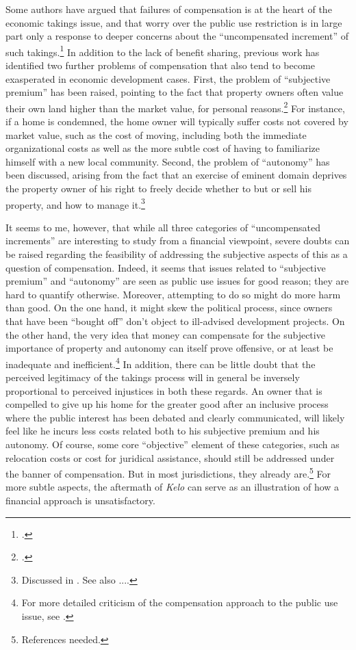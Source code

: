 Some authors have argued that failures of compensation is at the heart of the economic takings issue, and that worry over the public use restriction is in large part only a response to deeper concerns about the ``uncompensated increment'' of such takings.\footcite[See][962]{fennell04} In addition to the lack of benefit sharing, previous work has identified two further problems of compensation that also tend to become exasperated in economic development cases. First, the problem of ``subjective premium'' has been raised, pointing to the fact that property owners often value their own land higher than the market value, for personal reasons.\footcite[963]{fennell04} For instance, if a home is condemned, the home owner will typically suffer costs not covered by market value, such as the cost of moving, including both the immediate organizational costs as well as the more subtle cost of having to familiarize himself with a new local community. Second, the problem of ``autonomy'' has been discussed, arising from the fact that an exercise of eminent domain deprives the property owner of his right to freely decide whether to but or sell his property, and how to manage it.\footnote{Discussed in \cite[966-967]{fennell04}. See also ....}

It seems to me, however, that while all three categories of ``uncompensated increments'' are interesting to study from a financial viewpoint, severe doubts can be raised regarding the feasibility of addressing the subjective aspects of this as a question of compensation. Indeed, it seems that issues related to ``subjective premium'' and ``autonomy'' are seen as public use issues for good reason; they are hard to quantify otherwise. Moreover, attempting to do so might do more harm than good. On the one hand, it might skew the political process, since owners that have been ``bought off'' don't object to ill-advised development projects. On the other hand, the very idea that money can compensate for the subjective importance of property and autonomy can itself prove offensive, or at least be inadequate and inefficient.\footnote{For more detailed criticism of the compensation approach to the public use issue, see \cite{garnett06}.} In addition, there can be little doubt that the perceived legitimacy of the takings process will in general be inversely proportional to perceived injustices in both these regards. An owner that is compelled to give up his home for the greater good after an inclusive process where the public interest has been debated and clearly communicated, will likely feel like he incurs less costs related both to his subjective premium and his autonomy. Of course, some core ``objective'' element of these categories, such as relocation costs or cost for juridical assistance, should still be addressed under the banner of compensation. But in most jurisdictions, they already are.\footnote{References needed.} For more subtle aspects, the aftermath of {\it Kelo} can serve as an illustration of how a financial approach is unsatisfactory.

